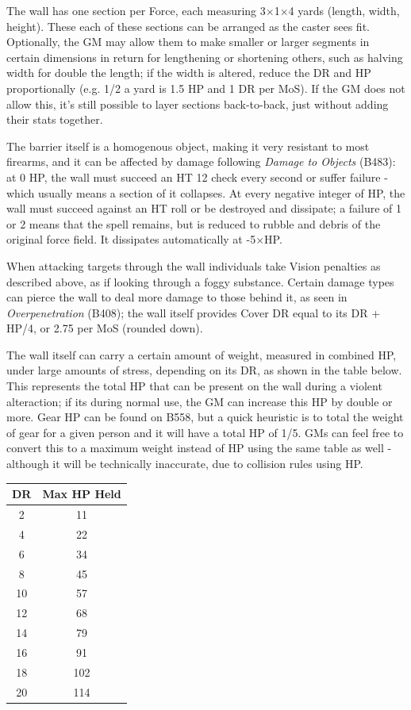 \begin{multicols}{3}
	The wall has one section per Force, each measuring 3$\times$1$\times$4 yards (length, width, height). These each of these sections can be arranged as the caster sees fit. Optionally, the GM may allow them to make smaller or larger segments in certain dimensions in return for lengthening or shortening others, such as halving width for double the length; if the width is altered, reduce the DR and HP proportionally (e.g. 1/2 a yard is 1.5 HP and 1 DR per MoS). If the GM does not allow this, it's still possible to layer sections back-to-back, just without adding their stats together.
	
	The barrier itself is a homogenous object, making it very resistant to most firearms, and it can be affected by damage following \textit{Damage to Objects} (B483): at 0 HP, the wall must succeed an HT 12 check every second or suffer failure - which usually means a section of it collapses. At every negative integer of HP, the wall must succeed against an HT roll or be destroyed and dissipate; a failure of 1 or 2 means that the spell remains, but is reduced to rubble and debris of the original force field. It dissipates automatically at -5$\times$HP.
	
	When attacking targets through the wall individuals take Vision penalties as described above, as if looking through a foggy substance. Certain damage types can pierce the wall to deal more damage to those behind it, as seen in \textit{Overpenetration} (B408); the wall itself provides Cover DR equal to its DR + HP/4, or 2.75 per MoS (rounded down).
	
	The wall itself can carry a certain amount of weight, measured in combined HP, under large amounts of stress, depending on its DR, as shown in the table below. This represents the total HP that can be present on the wall during a violent alteraction; if its during normal use, the GM can increase this HP by double or more. Gear HP can be found on B558, but a quick heuristic is to total the weight of gear for a given person and it will have a total HP of 1/5. GMs can feel free to convert this to a maximum weight instead of HP using the same table as well - although it will be technically inaccurate, due to collision rules using HP.
	
	\begin{center}
		\begin{tabular}{|c|c|}
			\hline
			DR & Max HP Held \\
			\hline
			\hline
			2 & 11 \\
			4 & 22 \\
			6 & 34 \\
			8 & 45 \\
			10 & 57 \\
			12 & 68 \\
			14 & 79 \\
			16 & 91 \\
			18 & 102 \\
			20 & 114 \\
			\hline
		\end{tabular}
	\end{center}	
		

\end{multicols}
